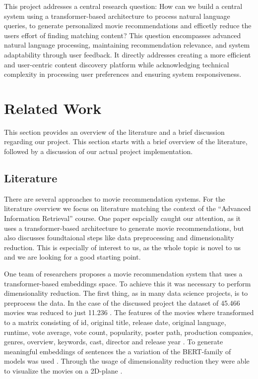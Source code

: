 \documentclass[12pt,a4paper]{article}
\begin{document}
This project addresses a central research question:
How can we build a central system using a transformer-based architecture to process natural language queries,
to generate personalized movie recommendations and efficetly reduce the users effort of finding matching content?
\newline \noindent This question encompasses advanced natural language processing, maintaining recommendation relevance, and system
adaptability through user feedback. It directly addresses creating a more efficient and user-centric content discovery
platform while acknowledging technical complexity in processing user preferences and ensuring system responsiveness.

\section{Related Work}

This section provides an overview of the literature and a brief discussion regarding our project.
This section starts with a brief overview of the literature, followed by a discussion of our actual project implementation.

\subsection{Literature}

There are several approaches to movie recommendation systems.
For the literature overview we focus on literature matching the context of the ``Advanced Information Retrieval'' course.
One paper espcially caught our attention, as it uses a transformer-based architecture to generate movie recommendations,
but also discusses foundtaional steps like data preprocessing and dimensionality reduction.
This is especially of interest to us, as the whole topic is novel to us and we are looking for a good starting point.

\noindent One team of researchers \cite{Iglesias-pardo-lopez-quintero-2024} proposes a movie recommendation system that uses a
transformer-based embeddings space. To achieve this it was necessary to perform dimensionality reduction.
The first thing, as in many data science projects, is to preprocess the data.
In the case of the discussed project the dataset of 45.466 movies was reduced to just 11.236 \cite{Iglesias-pardo-lopez-quintero-2024}.
The features of the movies where transformed to a matrix consisting of id, original title, release date,
original language, runtime, vote average, vote count, popularity, poster path, production companies, genres, overview,
keywords, cast, director and release year \cite{Iglesias-pardo-lopez-quintero-2024}.
To generate meaningful embeddings of sentences the a variation of the BERT-family of models was used \cite{Iglesias-pardo-lopez-quintero-2024}.
Through the usage of dimensionality reduction they were able to visualize the movies on a 2D-plane \cite{Iglesias-pardo-lopez-quintero-2024}.
\end{document}
